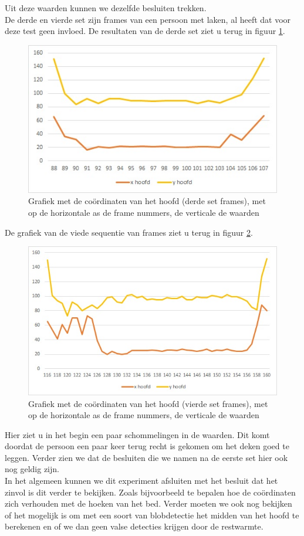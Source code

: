 Uit deze waarden kunnen we dezelfde besluiten trekken. \\
De derde en vierde set zijn frames van een persoon met laken, al heeft dat voor deze test geen invloed. De resultaten van de derde set ziet u terug in figuur \ref{imgCHM}. \\
\begin{figure}[hbp]
	\includegraphics[scale = 0.75]{Grafiek_UitBedM}
	\caption{Grafiek met de co\"ordinaten van het hoofd (derde set frames), met op de horizontale as de frame nummers, de verticale de waarden}
	\label{imgCHM}
\end{figure}
De grafiek van de viede sequentie van frames ziet u terug in figuur \ref{imgCHMT}.
\begin{figure}[hbp]
	\includegraphics[scale = 0.75]{Grafiek_UitBedMT}
	\caption{Grafiek met de co\"ordinaten van het hoofd (vierde set frames), met op de horizontale as de frame nummers, de verticale de waarden}
	\label{imgCHMT}
\end{figure}
Hier ziet u in het begin een paar schommelingen in de waarden. Dit komt doordat de persoon een paar keer terug recht is gekomen om het deken goed te leggen. Verder zien we dat de besluiten die we namen na de eerste set hier ook nog geldig zijn.\\
In het algemeen kunnen we dit experiment afsluiten met het besluit dat het zinvol is dit verder te bekijken. Zoals bijvoorbeeld te bepalen hoe de co\"ordinaten zich verhouden met de hoeken van het bed. Verder moeten we ook nog bekijken of het mogelijk is om met een soort van blobdetectie het midden van het hoofd te berekenen en of we dan geen valse detecties krijgen door de restwarmte.

